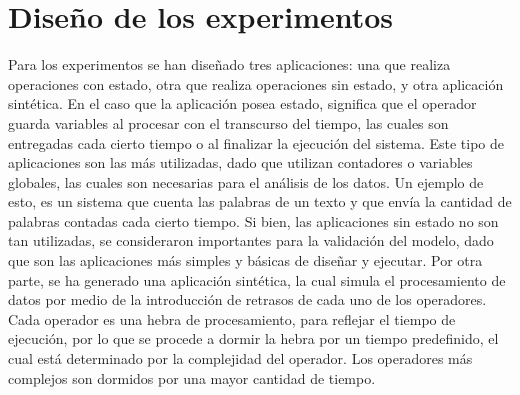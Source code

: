 

\section{Dise\~no de los experimentos}
Para los experimentos se han dise\~nado tres aplicaciones: una que realiza operaciones con estado, otra que realiza operaciones sin estado, y otra aplicaci\'on sint\'etica. En el caso que la aplicaci\'on posea estado, significa que el operador guarda variables al procesar con el transcurso del tiempo, las cuales son entregadas cada cierto tiempo o al finalizar la ejecuci\'on del sistema. Este tipo de aplicaciones son las m\'as utilizadas, dado que utilizan contadores o variables globales, las cuales son necesarias para el an\'alisis de los datos. Un ejemplo de esto, es un sistema que cuenta las palabras de un texto y que env\'ia la cantidad de palabras contadas cada cierto tiempo. Si bien, las aplicaciones sin estado no son tan utilizadas, se consideraron importantes para la validaci\'on del modelo, dado que son las aplicaciones m\'as simples y b\'asicas de dise\~nar y ejecutar. Por otra parte, se ha generado una aplicaci\'on sint\'etica, la cual simula el procesamiento de datos por medio de la introducci\'on de retrasos de cada uno de los operadores. Cada operador es una hebra de procesamiento, para reflejar el tiempo de ejecuci\'on, por lo que se procede a dormir la hebra por un tiempo predefinido, el cual est\'a determinado por la complejidad del operador. Los operadores m\'as complejos son dormidos por una mayor cantidad de tiempo.


